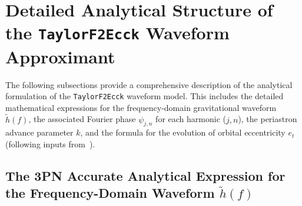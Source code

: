 \documentclass[aps,prd,twocolumn,superscriptaddress,groupedaddress,nofootinbib,showpacs,eqsecnum,useAms]{revtex4-2}
\renewcommand{\theequation}{\arabic{equation}}
\begin{document}

\appendix

\renewcommand{\theequation}{A\arabic{equation}} %

\section{Detailed Analytical Structure of the \texttt{TaylorF2Ecck} Waveform Approximant} \label{sec: TaylorF2Ecck_full}

The following subsections provide a comprehensive description of the analytical formulation of the \texttt{TaylorF2Ecck} waveform model. This includes the detailed mathematical expressions for the frequency-domain gravitational waveform $\tilde{h}(f)$, the associated Fourier phase $\psi_{j,n}$ for each harmonic ($j,n$), the periastron advance parameter $k$, and the formula for the evolution of orbital eccentricity $e_t$ (following inputs from~\cite{TGHH}).

\subsection{The 3PN Accurate Analytical Expression for the Frequency-Domain Waveform $\tilde{h}(f)$} \label{sec: TaylorF2Ecck hf}
\end{document}
